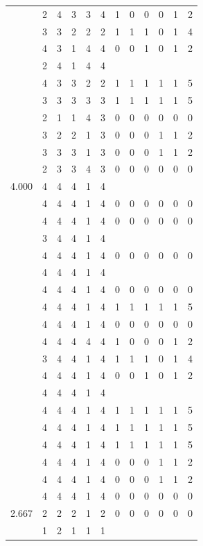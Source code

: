 \documentclass[]{msu-thesis}
\theoremstyle{definition}
\theoremstyle{definition}
\theoremstyle{definition}
\theoremstyle{remark}
\begin{document}
\begin{table}
{\begin{tabular}[t]{rrrrrrrrrrrr}
 & 2 & 4 & 3 & 3 & 4 & 1 & 0 & 0 & 0 & 1 & 2\\
 & 3 & 3 & 2 & 2 & 2 & 1 & 1 & 1 & 0 & 1 & 4\\
 & 4 & 3 & 1 & 4 & 4 & 0 & 0 & 1 & 0 & 1 & 2\\
 & 2 & 4 & 1 & 4 & 4 &  &  &  &  &  & \\
 & 4 & 3 & 3 & 2 & 2 & 1 & 1 & 1 & 1 & 1 & 5\\
 & 3 & 3 & 3 & 3 & 3 & 1 & 1 & 1 & 1 & 1 & 5\\
 & 2 & 1 & 1 & 4 & 3 & 0 & 0 & 0 & 0 & 0 & 0\\
 & 3 & 2 & 2 & 1 & 3 & 0 & 0 & 0 & 1 & 1 & 2\\
 & 3 & 3 & 3 & 1 & 3 & 0 & 0 & 0 & 1 & 1 & 2\\
 & 2 & 3 & 3 & 4 & 3 & 0 & 0 & 0 & 0 & 0 & 0\\
4.000 & 4 & 4 & 4 & 1 & 4 &  &  &  &  &  & \\
 & 4 & 4 & 4 & 1 & 4 & 0 & 0 & 0 & 0 & 0 & 0\\
 & 4 & 4 & 4 & 1 & 4 & 0 & 0 & 0 & 0 & 0 & 0\\
 & 3 & 4 & 4 & 1 & 4 &  &  &  &  &  & \\
 & 4 & 4 & 4 & 1 & 4 & 0 & 0 & 0 & 0 & 0 & 0\\
 & 4 & 4 & 4 & 1 & 4 &  &  &  &  &  & \\
 & 4 & 4 & 4 & 1 & 4 & 0 & 0 & 0 & 0 & 0 & 0\\
 & 4 & 4 & 4 & 1 & 4 & 1 & 1 & 1 & 1 & 1 & 5\\
 & 4 & 4 & 4 & 1 & 4 & 0 & 0 & 0 & 0 & 0 & 0\\
 & 4 & 4 & 4 & 4 & 4 & 1 & 0 & 0 & 0 & 1 & 2\\
 & 3 & 4 & 4 & 1 & 4 & 1 & 1 & 1 & 0 & 1 & 4\\
 & 4 & 4 & 4 & 1 & 4 & 0 & 0 & 1 & 0 & 1 & 2\\
 & 4 & 4 & 4 & 1 & 4 &  &  &  &  &  & \\
 & 4 & 4 & 4 & 1 & 4 & 1 & 1 & 1 & 1 & 1 & 5\\
 & 4 & 4 & 4 & 1 & 4 & 1 & 1 & 1 & 1 & 1 & 5\\
 & 4 & 4 & 4 & 1 & 4 & 1 & 1 & 1 & 1 & 1 & 5\\
 & 4 & 4 & 4 & 1 & 4 & 0 & 0 & 0 & 1 & 1 & 2\\
 & 4 & 4 & 4 & 1 & 4 & 0 & 0 & 0 & 1 & 1 & 2\\
 & 4 & 4 & 4 & 1 & 4 & 0 & 0 & 0 & 0 & 0 & 0\\
2.667 & 2 & 2 & 2 & 1 & 2 & 0 & 0 & 0 & 0 & 0 & 0\\
 & 1 & 2 & 1 & 1 & 1 &  &  &  &  &  & \\

\end{tabular}}
\end{table}
\end{document}
